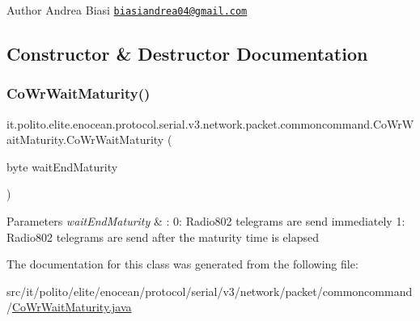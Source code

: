 \begin{DoxyAuthor}{Author}
Andrea Biasi \href{mailto:biasiandrea04@gmail.com}{\tt biasiandrea04@gmail.\+com} 
\end{DoxyAuthor}


\subsection{Constructor \& Destructor Documentation}
\hypertarget{classit_1_1polito_1_1elite_1_1enocean_1_1protocol_1_1serial_1_1v3_1_1network_1_1packet_1_1commoncommand_1_1_co_wr_wait_maturity_a0849d14ee4665bde1acb3ab3ef6c8a7d}{}\label{classit_1_1polito_1_1elite_1_1enocean_1_1protocol_1_1serial_1_1v3_1_1network_1_1packet_1_1commoncommand_1_1_co_wr_wait_maturity_a0849d14ee4665bde1acb3ab3ef6c8a7d} 
\subsubsection{\texorpdfstring{Co\+Wr\+Wait\+Maturity()}{CoWrWaitMaturity()}}
{\footnotesize\ttfamily it.\+polito.\+elite.\+enocean.\+protocol.\+serial.\+v3.\+network.\+packet.\+commoncommand.\+Co\+Wr\+Wait\+Maturity.\+Co\+Wr\+Wait\+Maturity (\begin{DoxyParamCaption}\item[{byte}]{wait\+End\+Maturity }\end{DoxyParamCaption})}


\begin{DoxyParams}{Parameters}
{\em wait\+End\+Maturity} & \+: 0\+: Radio802 telegrams are send immediately 1\+: Radio802 telegrams are send after the maturity time is elapsed \\
\hline
\end{DoxyParams}


The documentation for this class was generated from the following file\+:\begin{DoxyCompactItemize}
\item 
src/it/polito/elite/enocean/protocol/serial/v3/network/packet/commoncommand/\hyperlink{_co_wr_wait_maturity_8java}{Co\+Wr\+Wait\+Maturity.\+java}\end{DoxyCompactItemize}
